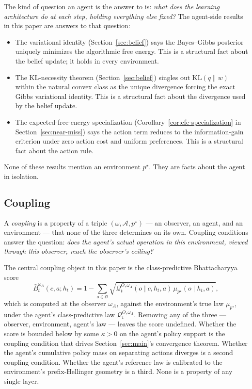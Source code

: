 \documentclass[11pt]{article}
\theoremstyle{definition}
\theoremstyle{remark}
\newcommand{\Acal}{\mathcal{A}}
\newcommand{\Ocal}{\mathcal{O}}
\newcommand{\Qcal}{\mathcal{Q}}
\newcommand{\KL}{\mathrm{KL}}
\begin{document}
The kind of question an agent is the answer to is: \emph{what does the learning architecture do at each step, holding everything else fixed?} The agent-side results in this paper are answers to that question:
\begin{itemize}
\item The variational identity (Section~\ref{sec:belief}) says the Bayes--Gibbs posterior uniquely minimizes the algorithmic free energy. This is a structural fact about the belief update; it holds in every environment.
\item The KL-necessity theorem (Section~\ref{sec:belief}) singles out $\KL(q\|w)$ within the natural convex class as the unique divergence forcing the exact Gibbs variational identity. This is a structural fact about the divergence used by the belief update.
\item The expected-free-energy specialization (Corollary~\ref{cor:efe-specialization} in Section~\ref{sec:near-miss}) says the action term reduces to the information-gain criterion under zero action cost and uniform preferences. This is a structural fact about the action rule.
\end{itemize}
None of these results mention an environment $p^\star$. They are facts about the agent in isolation.

\subsection{Coupling}
\label{sec:ontology-coupling}

A \emph{coupling} is a property of a triple $(\omega,\Acal,p^\star)$ --- an observer, an agent, and an environment --- that none of the three determines on its own. Coupling conditions answer the question: \emph{does the agent's actual operation in this environment, viewed through this observer, reach the observer's ceiling?}

The central coupling object in this paper is the class-predictive Bhattacharyya score
\[
\bar B_t^{\omega_A}(c,a;h_t)
=
1-\sum_{o\in\Ocal}\sqrt{\Qcal_t^{O,\omega_A}(o\mid c,h_t,a)\,\mu_{p^\star}(o\mid h_t,a)},
\]
which is computed at the observer $\omega_A$, against the environment's true law $\mu_{p^\star}$, under the agent's class-predictive law $\Qcal_t^{O,\omega_A}$. Removing any of the three --- observer, environment, agent's law --- leaves the score undefined. Whether the score is bounded below by some $\kappa>0$ on the agent's policy support is the coupling condition that drives Section~\ref{sec:main}'s convergence theorem. Whether the agent's cumulative policy mass on separating actions diverges is a second coupling condition. Whether the agent's reference law is calibrated to the environment's prefix-Hellinger geometry is a third. None is a property of any single layer.
\end{document}
